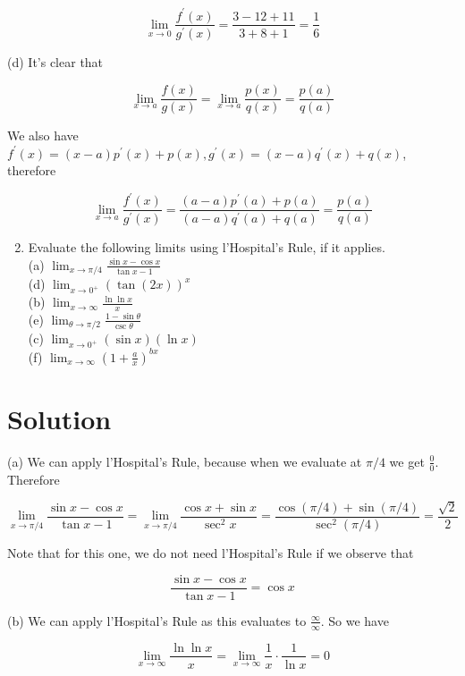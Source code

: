 \documentclass[10pt]{article}
\begin{document}
$$
\lim _{x \rightarrow 0} \frac{f^{\prime}(x)}{g^{\prime}(x)}=\frac{3-12+11}{3+8+1}=\frac{1}{6}
$$

(d) It's clear that

$$
\lim _{x \rightarrow a} \frac{f(x)}{g(x)}=\lim _{x \rightarrow a} \frac{p(x)}{q(x)}=\frac{p(a)}{q(a)}
$$

We also have $f^{\prime}(x)=(x-a) p^{\prime}(x)+p(x), g^{\prime}(x)=(x-a) q^{\prime}(x)+q(x)$, therefore

$$
\lim _{x \rightarrow a} \frac{f^{\prime}(x)}{g^{\prime}(x)}=\frac{(a-a) p^{\prime}(a)+p(a)}{(a-a) q^{\prime}(a)+q(a)}=\frac{p(a)}{q(a)}
$$

\begin{enumerate}
  \setcounter{enumi}{1}
  \item Evaluate the following limits using l'Hospital's Rule, if it applies.\\
(a) $\lim _{x \rightarrow \pi / 4} \frac{\sin x-\cos x}{\tan x-1}$\\
(d) $\lim _{x \rightarrow 0^{+}}(\tan (2 x))^{x}$\\
(b) $\lim _{x \rightarrow \infty} \frac{\ln \ln x}{x}$\\
(e) $\lim _{\theta \rightarrow \pi / 2} \frac{1-\sin \theta}{\csc \theta}$\\
(c) $\lim _{x \rightarrow 0^{+}}(\sin x)(\ln x)$\\
(f) $\lim _{x \rightarrow \infty}\left(1+\frac{a}{x}\right)^{b x}$
\end{enumerate}

\section*{Solution}
(a) We can apply l'Hospital's Rule, because when we evaluate at $\pi / 4$ we get $\frac{0}{0}$. Therefore

$$
\lim _{x \rightarrow \pi / 4} \frac{\sin x-\cos x}{\tan x-1}=\lim _{x \rightarrow \pi / 4} \frac{\cos x+\sin x}{\sec ^{2} x}=\frac{\cos (\pi / 4)+\sin (\pi / 4)}{\sec ^{2}(\pi / 4)}=\frac{\sqrt{2}}{2}
$$

Note that for this one, we do not need l'Hospital's Rule if we observe that

$$
\frac{\sin x-\cos x}{\tan x-1}=\cos x
$$

(b) We can apply l'Hospital's Rule as this evaluates to $\frac{\infty}{\infty}$. So we have

$$
\lim _{x \rightarrow \infty} \frac{\ln \ln x}{x}=\lim _{x \rightarrow \infty} \frac{1}{x} \cdot \frac{1}{\ln x}=0
$$
\end{document}
